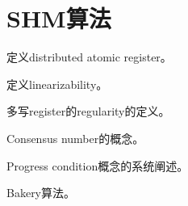 \chapter{SHM算法}

\begin{theorem}
    
    定义distributed atomic register。
    
\end{theorem}

\begin{theorem}
    
    定义linearizability。
    
\end{theorem}

\begin{theorem}
    
    多写register的regularity的定义。
    
\end{theorem}

\begin{theorem}
    
    Consensus number的概念。
    
\end{theorem}

\begin{theorem}
    
    Progress condition概念的系统阐述。
    
\end{theorem}

\begin{theorem}

    Bakery算法。

\end{theorem}